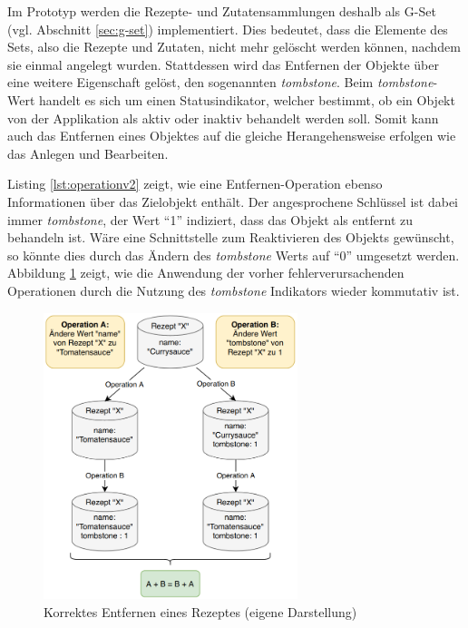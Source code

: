 \documentclass[a4paper, 12pt]{scrreprt}
\begin{document}
Im Prototyp werden die Rezepte- und Zutatensammlungen deshalb als G-Set (vgl. Abschnitt \ref{sec:g-set}) implementiert. Dies bedeutet, dass die Elemente des Sets, also die Rezepte und Zutaten, nicht mehr gelöscht werden können, nachdem sie einmal angelegt wurden. Stattdessen wird das Entfernen der Objekte über eine weitere Eigenschaft gelöst, den sogenannten \textit{tombstone}. Beim \textit{tombstone}-Wert handelt es sich um einen Statusindikator, welcher bestimmt, ob ein Objekt von der Applikation als aktiv oder inaktiv behandelt werden soll. Somit kann auch das Entfernen eines Objektes auf die gleiche Herangehensweise erfolgen wie das Anlegen und Bearbeiten.

\begin{minipage}{\linewidth}
	
\end{minipage}

Listing \ref{lst:operationv2} zeigt, wie eine Entfernen-Operation ebenso Informationen über das Zielobjekt enthält. Der angesprochene Schlüssel ist dabei immer \textit{tombstone}, der Wert \enquote{1} indiziert, dass das Objekt als entfernt zu behandeln ist. Wäre eine Schnittstelle zum Reaktivieren des Objekts gewünscht, so könnte dies durch das Ändern des \textit{tombstone} Werts auf \enquote{0} umgesetzt werden. Abbildung \ref{fig:rezeptLöschenGut} zeigt, wie die Anwendung der vorher fehlerverursachenden Operationen durch die Nutzung des \textit{tombstone} Indikators wieder kommutativ ist.

\begin{figure}[H]
	\centering
	\includegraphics[width=0.66\textwidth]{deleteRecipeGood.png}
	\caption[Korrektes Entfernen eines Rezeptes]{Korrektes Entfernen eines Rezeptes (eigene Darstellung)}
	\label{fig:rezeptLöschenGut}
\end{figure}
\end{document}
